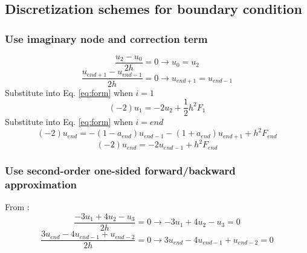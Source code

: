 \subsection{Discretization schemes for boundary condition}
\subsubsection{Use imaginary node and correction term}
\begin{equation}
\frac{u_2 - u_0}{2h} = 0 \rightarrow u_0 = u_2
\end{equation}
\begin{equation}
\frac{u_{end + 1} - u_{end - 1}}{2h} = 0 \rightarrow u_{end + 1} = u_{end - 1}
\end{equation}
Substitute into Eq. \eqref{eq:form} when $i = 1$
\begin{equation}
(-2)u_1 = -2u_2 + \frac{1}{2} h^2 F_1
\end{equation}
Substitute into Eq. \eqref{eq:form} when $i = end$
\begin{equation}
(-2)u_{end} = -\left (1 - a_{end} \right)u_{end - 1} -
\left (1 + a_{end} \right)u_{end + 1} + h^2 F_{end}
\end{equation}
\begin{equation}
(-2)u_{end} = -2u_{end - 1} + h^2 F_{end}
\end{equation}

\subsubsection{Use second-order one-sided forward/backward approximation}
From \cite{MorrisOneSided}:
\begin{equation}
\frac{-3u_1 + 4u_2 - u_3}{2h} = 0 \rightarrow -3u_1 + 4u_2 - u_3 = 0
\end{equation}
\begin{equation}
\frac{3u_{end} - 4u_{end - 1} + u_{end - 2}}{2h} = 0 \rightarrow 
3u_{end} - 4u_{end - 1} + u_{end - 2} = 0
\end{equation}